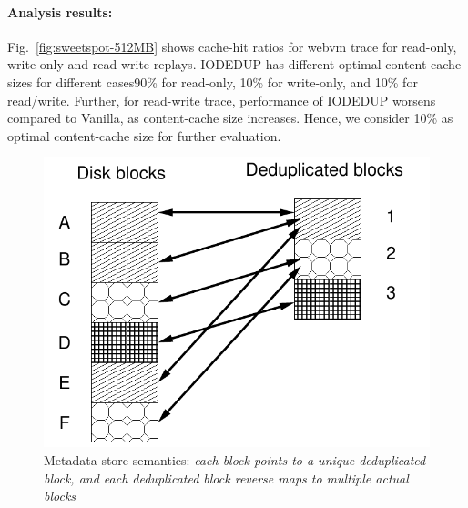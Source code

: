 \vspace{-0.2in}
\paragraph{Analysis results:} Fig.~\ref{fig:sweetspot-512MB} 
shows cache-hit ratios for webvm trace for read-only, write-only and
read-write replays. IODEDUP has different optimal content-cache sizes for different 
cases\textemdash{}90\% for read-only, 10\% for write-only, and 10\% for read/write. 
Further, for read-write trace, performance of IODEDUP worsens compared to Vanilla, 
as content-cache size increases. Hence,
we consider 10\% as optimal content-cache size for further evaluation.

\begin{figure}
	\RawFloats
	\begin{minipage}{0.4\textwidth}
    \centering
    \includegraphics[scale=0.5]{confided-figures/main/deduped-block.pdf}
	\caption{Metadata store semantics: \textit{each block points to a unique deduplicated block, and each deduplicated block reverse maps to multiple actual blocks}}
    \label{fig:deduped-block}
	\end{minipage}
	\hfill
	\begin{minipage}{0.55\textwidth}
    \centering

\end{minipage}
\end{figure}
